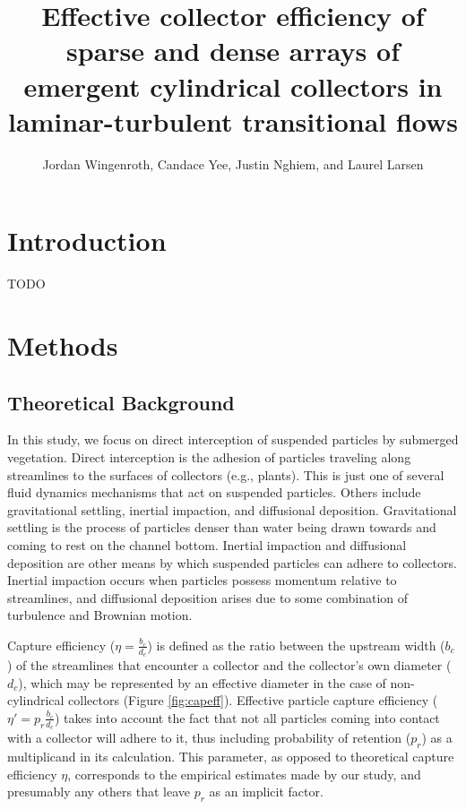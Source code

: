 \documentclass[parskip=full-]{scrreprt}
\author{Jordan Wingenroth, Candace Yee, Justin Nghiem, and Laurel Larsen}
\title{Effective collector efficiency of sparse and dense arrays of emergent cylindrical collectors in laminar-turbulent transitional flows}
\begin{document}
\maketitle

\chapter{Introduction}

TODO

\chapter{Methods}

\section{Theoretical Background}

In this study, we focus on direct interception of suspended particles by submerged vegetation. Direct interception is the adhesion of particles traveling along streamlines to the surfaces of collectors (e.g., plants). This is just one of several fluid dynamics mechanisms that act on suspended particles. Others include gravitational settling, inertial impaction, and diffusional deposition. Gravitational settling is the process of particles denser than water being drawn towards and coming to rest on the channel bottom. Inertial impaction and diffusional deposition are other means by which suspended particles can adhere to collectors. Inertial impaction occurs when particles possess momentum relative to streamlines, and diffusional deposition arises due to some combination of turbulence and Brownian motion.

Capture efficiency ($\eta=\frac{b_c}{d_c}$) is defined as the ratio between the upstream width ($b_c$) of the streamlines that encounter a collector and the collector's own diameter (\(d_c\)), which may be represented by an effective diameter in the case of non-cylindrical collectors (Figure \ref{fig:capeff}). Effective particle capture efficiency (\(\eta\prime=p_r\frac{b_c}{d_c}\)) takes into account the fact that not all particles coming into contact with a collector will adhere to it, thus including probability of retention (\(p_r\)) as a multiplicand in its calculation. This parameter, as opposed to theoretical capture efficiency $\eta$, corresponds to the empirical estimates made by our study, and presumably any others that leave $p_r$ as an implicit factor.
\end{document}
